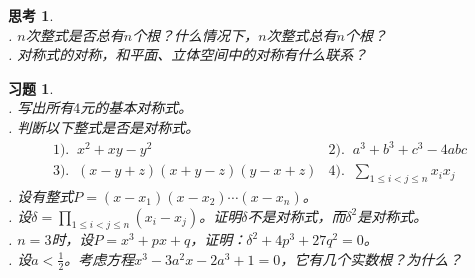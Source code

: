 \documentclass[12pt,UTF8]{ctexbook}
\theoremstyle{definition}
\theoremstyle{plain}
\newtheorem{sk}{思考}[section]
\newtheorem{xt}{习题}[section]
\begin{document}

\begin{sk}
    \mbox{} \\
    . $n$次整式是否总有$n$个根？什么情况下，$n$次整式总有$n$个根？\\
    . 对称式的对称，和平面、立体空间中的对称有什么联系？

\end{sk}

\begin{xt}
    \mbox{} \\
    . 写出所有$4$元的基本对称式。\\
    . 判断以下整式是否是对称式。\\
    $$
    \begin{array}{ll}
       1).\;\; x^2 + xy - y^2 & 2).\;\; a^3 + b^3 + c^3 - 4abc \\
       3).\;\;  (x - y + z)(x + y - z)(y - x + z) & 4).\;\; \displaystyle\sum_{1\leqslant i < j \leqslant n} x_i x_j
    \end{array}
    $$
    . 设有整式$P = (x - x_1)(x - x_2) \cdots (x - x_n)$。\\
    . 设$\displaystyle\delta = \prod_{1\leqslant i < j \leqslant n} (x_i - x_j)$。证明$\delta$不是对称式，而$\delta^2$是对称式。\\
    . $n=3$时，设$P = x^3 + px + q$，证明：$\delta^2 + 4p^3 + 27 q^2 = 0$。\\
    . 设$a<\frac{1}{2}$。考虑方程$x^3 - 3a^2x - 2a^3 + 1 = 0$，它有几个实数根？为什么？
\end{xt}

\end{document}

